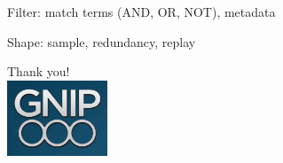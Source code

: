 \documentclass{beamer}
\begin{document}
%
\begin{frame}
\begin{center}
{\Huge Filter: match terms (AND, OR, NOT), metadata }
\end{center}
\end{frame}


\begin{frame}
\begin{center}
{\Huge Shape: sample, redundancy, replay }
\end{center}
\end{frame}


\begin{frame}
  \begin{center}
  \Large{Thank you!  \\ [20pt]}
    \includegraphics[width=3cm]{./imgs/logo.png}
  \end{center}
\end{frame}
\end{document}
